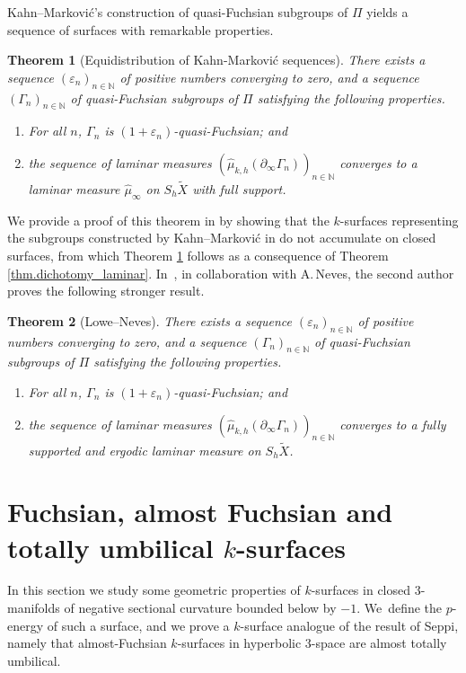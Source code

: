 \documentclass[11pt]{article}
\newcommand{\ksurface}{$k$\nobreakdash-surface\xspace}
\newcommand{\ksurfaces}{$k$\nobreakdash-surfaces\xspace}
\theoremstyle{plain}
\newtheorem{theorem}{Theorem}[section]
\theoremstyle{definition}
\let\eps\varepsilon
\newcommand{\bord}{\partial_{\infty}}
\begin{document}
Kahn--Markovi\'c's construction \cite{KM1} of quasi-Fuchsian subgroups of $\Pi$ yields a sequence of surfaces with remarkable properties.

\begin{theorem}[Equidistribution of Kahn-Markovi\'c sequences]\label{KM_equidistrib}
There exists a sequence $(\eps_n)_{n\in\mathbb{N}}$ of positive numbers converging to zero, and a sequence $(\Gamma_n)_{n\in\mathbb{N}}$ of quasi-Fuchsian subgroups of $\Pi$ satisfying the following properties.
\begin{enumerate}
\item For all $n$, $\Gamma_n$ is $(1+\eps_n)$-quasi-Fuchsian; and
\item the sequence of laminar measures $(\hat \mu_{k,h}(\bord\Gamma_n))_{n\in\mathbb{N}}$ converges to a laminar measure $\hat \mu_\infty$ on $S_h\tilde{X}$ with full support.
\end{enumerate}
\end{theorem}

We provide a proof of this theorem in \cite{ALS} by showing that the \ksurfaces representing the subgroups constructed by Kahn--Markovi\'c in \cite{KM1} do not accumulate on closed surfaces, from which Theorem \ref{KM_equidistrib} follows as a consequence of Theorem \ref{thm.dichotomy_laminar}. In~\cite[Prop.\,6.1]{ln21}, in collaboration with A.\,Neves, the second author proves the following stronger result.

\begin{theorem}[Lowe--Neves]\label{th.lowe_neves}
There exists a sequence $(\eps_n)_{n\in\mathbb{N}}$ of positive numbers converging to zero, and a sequence $(\Gamma_n)_{n\in\mathbb{N}}$ of quasi-Fuchsian subgroups of $\Pi$ satisfying the following properties.
\begin{enumerate}
\item For all $n$, $\Gamma_n$ is $(1+\eps_n)$-quasi-Fuchsian; and
\item the sequence of laminar measures $(\hat \mu_{k,h}(\bord\Gamma_n))_{n\in\mathbb{N}}$ converges to a fully supported and ergodic laminar measure on $S_h\tilde{X}$.
\end{enumerate}
\end{theorem}

\section{Fuchsian, almost Fuchsian and totally umbilical \texorpdfstring{\protect\ksurfaces}{ksurf}} In this section we study some geometric properties of \ksurfaces in closed $3$\nobreakdash-manifolds of negative sectional curvature bounded below by $-1$. We~define the $p$-energy of such a surface, and we prove a \ksurface analogue of the result \cite{Seppi} of Seppi, namely that almost-Fuchsian \ksurfaces in hyperbolic $3$\nobreakdash-space are almost totally umbilical.
\end{document}
